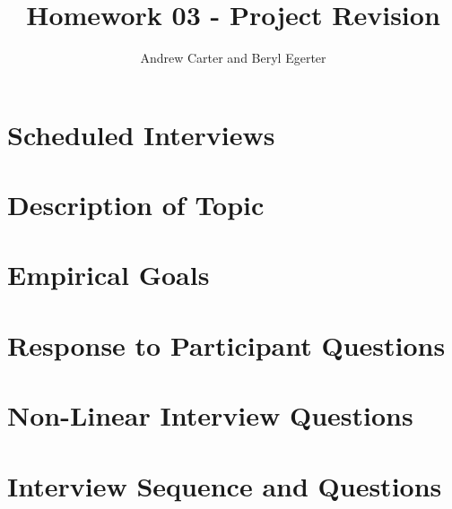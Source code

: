 \documentclass{article}
\title{Homework 03 - Project Revision}
\author{Andrew Carter and Beryl Egerter}
\begin{document}
\maketitle
\section{Scheduled Interviews}

\section{Description of Topic}

\section{Empirical Goals}

\section{Response to Participant Questions}

\section{Non-Linear Interview Questions}

\section{Interview Sequence and Questions}
\end{document}
